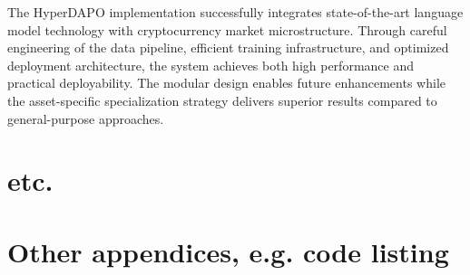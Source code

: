 \documentclass{report}
\begin{document}
The HyperDAPO implementation successfully integrates state-of-the-art language model technology with cryptocurrency market microstructure. Through careful engineering of the data pipeline, efficient training infrastructure, and optimized deployment architecture, the system achieves both high performance and practical deployability. The modular design enables future enhancements while the asset-specific specialization strategy delivers superior results compared to general-purpose approaches.

\chapter{etc.}
\appendix




\chapter{Other appendices, e.g. code listing}
\end{document}
